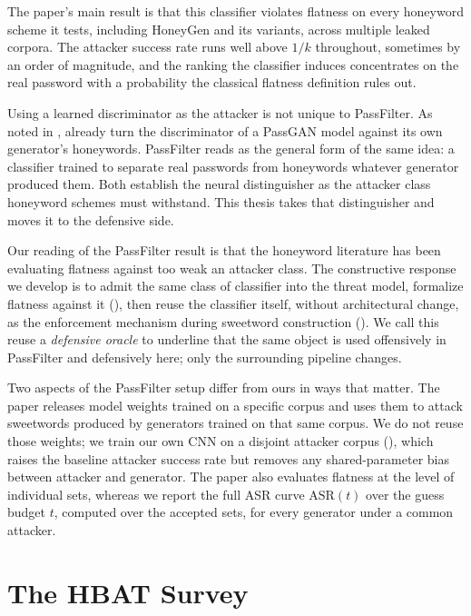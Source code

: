 The paper's main result is that this classifier violates flatness on
every honeyword scheme it tests, including HoneyGen and its variants,
across multiple leaked corpora. The attacker success rate runs well
above $1/k$ throughout, sometimes by an order of magnitude, and the
ranking the classifier induces concentrates on the real password with a
probability the classical flatness definition rules out.

Using a learned discriminator as the attacker is not unique to
PassFilter. As noted in ,
\textcite{fauzi2020passgan} already turn the discriminator of a PassGAN
model against its own generator's honeywords. PassFilter reads as the
general form of the same idea: a classifier trained to separate real
passwords from honeywords whatever generator produced them. Both
establish the neural distinguisher as the attacker class honeyword
schemes must withstand. This thesis takes that distinguisher and moves
it to the defensive side.

Our reading of the PassFilter result is that the honeyword literature
has been evaluating flatness against too weak an attacker class. The
constructive response we develop is to admit the same class of
classifier into the threat model, formalize flatness against it
(), then reuse the classifier itself, without
architectural change, as the enforcement mechanism during sweetword
construction (). We call this reuse a
\emph{defensive oracle} to underline that the same object is used
offensively in PassFilter and defensively here; only the surrounding
pipeline changes.

Two aspects of the PassFilter setup differ from ours in ways that
matter. The paper releases model weights trained on a specific corpus
and uses them to attack sweetwords produced by generators trained on
that same corpus. We do not reuse those weights; we train our own CNN on
a disjoint attacker corpus (), which raises the
baseline attacker success rate but removes any shared-parameter bias
between attacker and generator. The paper also evaluates flatness at the
level of individual sets, whereas we report the full ASR curve
$\mathrm{ASR}(t)$ over the guess budget $t$, computed over the accepted
sets, for every generator under a common attacker.

\section{The HBAT Survey}
\label{sec:related-survey}

